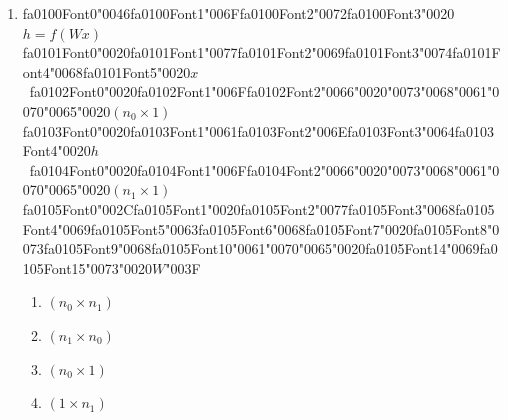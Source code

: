 \documentclass[12pt]{article}
\begin{document}
\begin{enumerate}[label=Q\arabic*.]
\begin{enumerate}[label=(\Alph*)]
    \item Both the input at time $t$ and the hidden state at time $t-1$
    \item All future inputs
\end{enumerate}
\item {\csname fa0100Font0\endcsname\char"0046}{\csname fa0100Font1\endcsname\char"006F}{\csname fa0100Font2\endcsname\char"0072}{\csname fa0100Font3\endcsname\char"0020}$h = f(Wx)${\csname fa0101Font0\endcsname\char"0020}{\csname fa0101Font1\endcsname\char"0077}{\csname fa0101Font2\endcsname\char"0069}{\csname fa0101Font3\endcsname\char"0074}{\csname fa0101Font4\endcsname\char"0068}{\csname fa0101Font5\endcsname\char"0020}$x$\ {\csname fa0102Font0\endcsname\char"0020}{\csname fa0102Font1\endcsname\char"006F}{\csname fa0102Font2\endcsname\char"0066}{\char"0020}{\char"0073}{\char"0068}{\char"0061}{\char"0070}{\char"0065}{\char"0020}$(n_0 \times 1)${\csname fa0103Font0\endcsname\char"0020}{\csname fa0103Font1\endcsname\char"0061}{\csname fa0103Font2\endcsname\char"006E}{\csname fa0103Font3\endcsname\char"0064}{\csname fa0103Font4\endcsname\char"0020}$h$\ {\csname fa0104Font0\endcsname\char"0020}{\csname fa0104Font1\endcsname\char"006F}{\csname fa0104Font2\endcsname\char"0066}{\char"0020}{\char"0073}{\char"0068}{\char"0061}{\char"0070}{\char"0065}{\char"0020}$(n_1 \times 1)${\csname fa0105Font0\endcsname\char"002C}{\csname fa0105Font1\endcsname\char"0020}{\csname fa0105Font2\endcsname\char"0077}{\csname fa0105Font3\endcsname\char"0068}{\csname fa0105Font4\endcsname\char"0069}{\csname fa0105Font5\endcsname\char"0063}{\csname fa0105Font6\endcsname\char"0068}{\csname fa0105Font7\endcsname\char"0020}{\csname fa0105Font8\endcsname\char"0073}{\csname fa0105Font9\endcsname\char"0068}{\csname fa0105Font10\endcsname\char"0061}{\char"0070}{\char"0065}{\char"0020}{\csname fa0105Font14\endcsname\char"0069}{\csname fa0105Font15\endcsname\char"0073}{\char"0020}$W${\char"003F}
\begin{enumerate}[label=(\Alph*)]
    \item $(n_0 \times n_1)$
    \item $(n_1 \times n_0)$
    \item $(n_0 \times 1)$
    \item $(1 \times n_1)$
\end{enumerate}

\end{enumerate}
\end{document}

